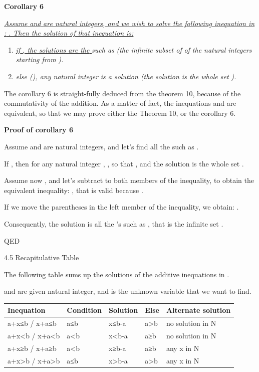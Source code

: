 \documentclass{article}
\providecommand{\tightlist}{%
  \setlength{\itemsep}{0pt}\setlength{\parskip}{0pt}}
\begin{document}
\textbf{Corollary }\textbf{6}

\ul{\emph{Assume }}\ul{\emph{ and }}\ul{\emph{ are natural integers, and we wish to solve the following inequation in }}\ul{\emph{: }}\ul{\emph{. Then the solution of that inequation is:}}

\begin{enumerate}
\tightlist
\item \ul{\emph{if }}\ul{\emph{, the solutions are the }}\emph{ such as }\emph{ (the infinite subset of }\emph{ of the natural integers starting from }\emph{).}
\item \emph{else (}\emph{), any natural integer }\emph{ is a solution (the solution is the whole set }\emph{).}
\end{enumerate}

The corollary 6 is straight-fully deduced from the theorem 10, because of the commutativity of the addition. As a matter of fact, the inequations  and  are equivalent, so that we may prove either the Theorem 10, or the corollary 6.

\textbf{Proof of corollary 6}

Assume  and  are natural integers, and let’s find all the  such as .

If , then for any natural integer , , so that , and the solution is the whole set .

Assume now , and let’s subtract  to both members of the inequality, to obtain the equivalent inequality: , that is valid because .

If we move the parentheses in the left member of the inequality, we obtain: .

Consequently, the solution is all the ’s such as , that is the infinite set .

QED

4.5 Recapitulative Table

The following table sums up the solutions of the additive inequations in .

 and  are given natural integer, and  is the unknown variable that we want to find.

\begin{table}[ht]
\centering
\begin{tabular}{@{}lllll@{}}
\toprule
Inequation & Condition & Solution & Else & Alternate solution \\
\midrule
a+x≤b / x+a≤b & a≤b & x≤b-a & a>b & no solution in N \\
a+x<b / x+a<b & a<b & x<b-a & a≥b & no solution in N \\
a+x≥b / x+a≥b & a<b & x≥b-a & a≥b & any x in N \\
a+x>b / x+a>b & a≤b & x>b-a & a>b & any x in N \\
\bottomrule
\end{tabular}
\end{table}
\end{document}

